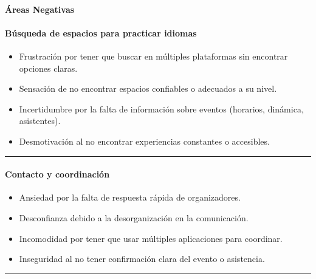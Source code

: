 \paragraph{Áreas
Negativas}\label{report__20-cap2-requirements-analysis.md__uxe1reas-negativas}

\paragraph{Búsqueda de espacios para practicar
idiomas}\label{report__20-cap2-requirements-analysis.md__buxfasqueda-de-espacios-para-practicar-idiomas}

\begin{itemize}
\tightlist
\item
  Frustración por tener que buscar en múltiples plataformas sin
  encontrar opciones claras.
\item
  Sensación de no encontrar espacios confiables o adecuados a su nivel.
\item
  Incertidumbre por la falta de información sobre eventos (horarios,
  dinámica, asistentes).
\item
  Desmotivación al no encontrar experiencias constantes o accesibles.
\end{itemize}

\begin{center}\rule{0.5\linewidth}{0.5pt}\end{center}

\paragraph{Contacto y
coordinación}\label{report__20-cap2-requirements-analysis.md__contacto-y-coordinaciuxf3n}

\begin{itemize}
\tightlist
\item
  Ansiedad por la falta de respuesta rápida de organizadores.
\item
  Desconfianza debido a la desorganización en la comunicación.
\item
  Incomodidad por tener que usar múltiples aplicaciones para coordinar.
\item
  Inseguridad al no tener confirmación clara del evento o asistencia.
\end{itemize}

\begin{center}\rule{0.5\linewidth}{0.5pt}\end{center}

